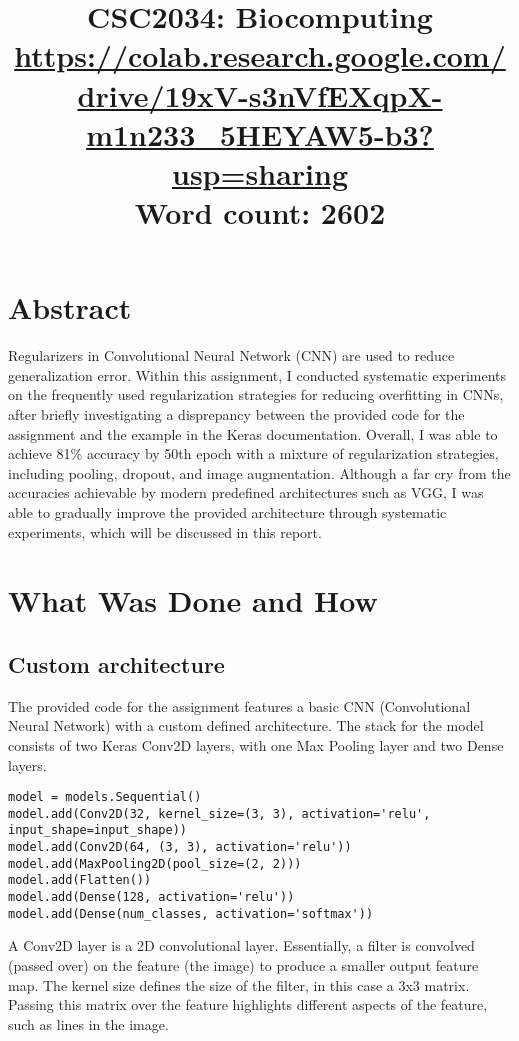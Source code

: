 \documentclass{article}
\title{CSC2034: Biocomputing\\\vspace{5mm}\normalsize{\url{https://colab.research.google.com/drive/19xV-s3nVfEXqpX-m1n233_5HEYAW5-b3?usp=sharing}\\\vspace{5mm}Word count: 2602}}
\begin{document}
\maketitle
\section{Abstract}

Regularizers in Convolutional Neural Network (CNN) are used to reduce generalization error. Within this assignment, I conducted systematic experiments on the frequently used regularization strategies for reducing overfitting in CNNs, after briefly investigating a disprepancy between the provided code for the assignment and the example in the Keras documentation. Overall, I was able to achieve 81\% accuracy by 50th epoch with a mixture of regularization strategies, including pooling, dropout, and image augmentation. Although a far cry from the accuracies achievable by modern predefined architectures such as VGG, I was able to gradually improve the provided architecture through systematic experiments, which will be discussed in this report.

\section{What Was Done and How}


\subsection{Custom architecture}
The provided code for the assignment features a basic CNN (Convolutional Neural Network) with a custom defined architecture. The stack for the model consists of two Keras Conv2D layers, with one Max Pooling layer and two Dense layers.

\begin{lstlisting}
model = models.Sequential()
model.add(Conv2D(32, kernel_size=(3, 3), activation='relu', input_shape=input_shape))
model.add(Conv2D(64, (3, 3), activation='relu'))
model.add(MaxPooling2D(pool_size=(2, 2)))
model.add(Flatten())
model.add(Dense(128, activation='relu'))
model.add(Dense(num_classes, activation='softmax'))
\end{lstlisting}

A Conv2D layer is a 2D convolutional layer. Essentially, a filter is convolved (passed over) on the feature (the image) to produce a smaller output feature map. The kernel size defines the size of the filter, in this case a 3x3 matrix. Passing this matrix over the feature highlights different aspects of the feature, such as lines in the image.\autocite{conv2d}
\end{document}
